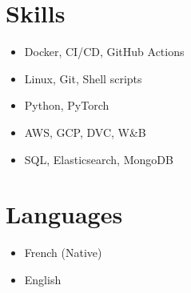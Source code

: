 \documentclass[a4paper,10pt]{article}
\begin{document}
\begin{adjustbox}{valign=t}
\begin{minipage}{0.3\textwidth}
        \section*{Skills}
        \raggedright
        \begin{itemize}
            \itemsep0em
            \item Docker, CI/CD, GitHub Actions
            \item Linux, Git, Shell scripts
            \item Python, PyTorch
            \item AWS, GCP, DVC, W\&B
            \item SQL, Elasticsearch, MongoDB
        \end{itemize}
        \vspace{-.5cm}
        \section*{Languages}
        \raggedright
        \begin{itemize}
            \itemsep0em
            \item French (Native)
            \item English
        \end{itemize}
        \vspace{-.5cm}
    \end{minipage}
\end{adjustbox}
\hfill
\begin{adjustbox}{valign=t}
    \begin{minipage}{0.02\textwidth}
        \MyVerticalRule
    \end{minipage}
\end{adjustbox}
\hfill
\end{document}
